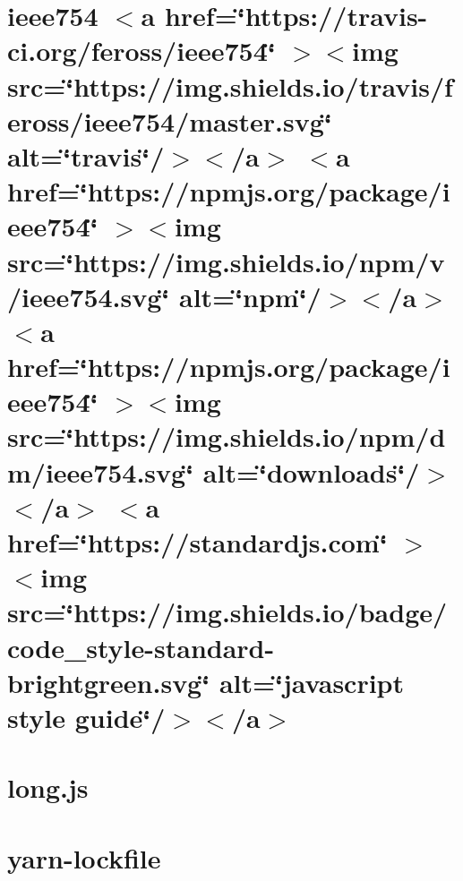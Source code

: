 \documentclass[twoside]{book}
\newcommand{\+}{\discretionary{\mbox{\scriptsize$\hookleftarrow$}}{}{}}
\begin{document}
\chapter{ieee754 \texorpdfstring{$<$}{<}a href=\char`\"{}https\+://travis-\/ci.\+org/feross/ieee754\char`\"{} \texorpdfstring{$>$}{>}\texorpdfstring{$<$}{<}img src=\char`\"{}https\+://img.\+shields.\+io/travis/feross/ieee754/master.\+svg\char`\"{} alt=\char`\"{}travis\char`\"{}/\texorpdfstring{$>$}{>}\texorpdfstring{$<$}{<}/a\texorpdfstring{$>$}{>} \texorpdfstring{$<$}{<}a href=\char`\"{}https\+://npmjs.\+org/package/ieee754\char`\"{} \texorpdfstring{$>$}{>}\texorpdfstring{$<$}{<}img src=\char`\"{}https\+://img.\+shields.\+io/npm/v/ieee754.\+svg\char`\"{} alt=\char`\"{}npm\char`\"{}/\texorpdfstring{$>$}{>}\texorpdfstring{$<$}{<}/a\texorpdfstring{$>$}{>} \texorpdfstring{$<$}{<}a href=\char`\"{}https\+://npmjs.\+org/package/ieee754\char`\"{} \texorpdfstring{$>$}{>}\texorpdfstring{$<$}{<}img src=\char`\"{}https\+://img.\+shields.\+io/npm/dm/ieee754.\+svg\char`\"{} alt=\char`\"{}downloads\char`\"{}/\texorpdfstring{$>$}{>}\texorpdfstring{$<$}{<}/a\texorpdfstring{$>$}{>} \texorpdfstring{$<$}{<}a href=\char`\"{}https\+://standardjs.\+com\char`\"{} \texorpdfstring{$>$}{>}\texorpdfstring{$<$}{<}img src=\char`\"{}https\+://img.\+shields.\+io/badge/code\+\_\+style-\/standard-\/brightgreen.\+svg\char`\"{} alt=\char`\"{}javascript style guide\char`\"{}/\texorpdfstring{$>$}{>}\texorpdfstring{$<$}{<}/a\texorpdfstring{$>$}{>}}
\label{md__c___users_vaishnavi_jadhav__desktop__developer_code_mean_stack_example_client_node_modules__xtuc_ieee754__r_e_a_d_m_e}

\chapter{long.\+js}
\label{md__c___users_vaishnavi_jadhav__desktop__developer_code_mean_stack_example_client_node_modules__xtuc_long__r_e_a_d_m_e}

\chapter{yarn-\/lockfile}
\label{md__c___users_vaishnavi_jadhav__desktop__developer_code_mean_stack_example_client_node_modules__yarnpkg_lockfile__r_e_a_d_m_e}

\end{document}
